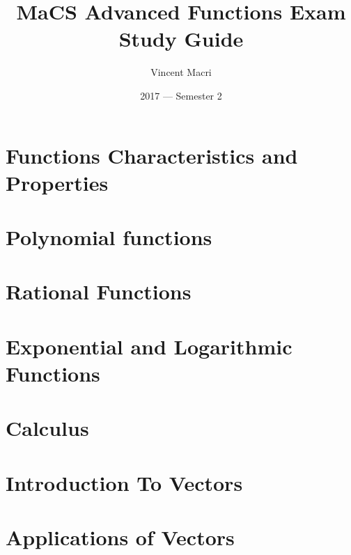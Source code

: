\documentclass[letterpaper,12pt]{report}
\title{MaCS Advanced Functions Exam Study Guide}
\author{Vincent Macri}
\date{2017 --- Semester 2}
\begin{document}
	\maketitle
	\clearpage
	\tableofcontents
	\clearpage

	\part{Functions Characteristics and Properties}
		
	\part{Polynomial functions}
		
		
	\part{Rational Functions}
		
	\part{Exponential and Logarithmic Functions}
		
	\part{Calculus}
		
	\part{Introduction To Vectors}
		
	\part{Applications of Vectors}
		
	\appendix
		
\end{document}
